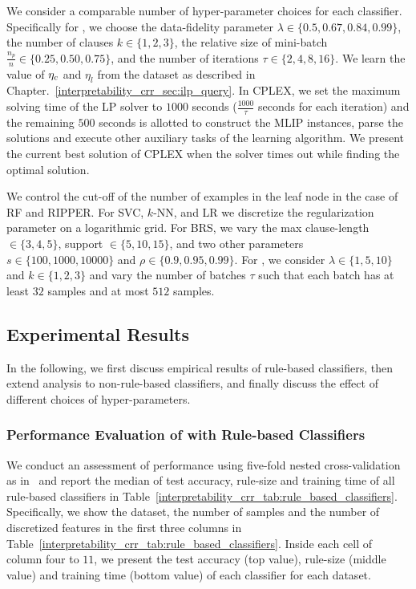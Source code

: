 


We consider a comparable number  of hyper-parameter choices  for each classifier. Specifically for {\crr}, we choose the data-fidelity parameter $ \lambda \in \{0.5, 0.67, 0.84, 0.99\} $, the number of clauses $ k \in \{1,2,3\} $, the relative size of mini-batch $ \frac{n_p}{n} \in \{0.25, 0.50, 0.75\} $, and the number of iterations $ \tau \in \{2,4,8,16\} $. We learn the value of $ \eta_c $ and $ \eta_{l} $ from the dataset as described in Chapter.~\ref{interpretability_crr_sec:ilp_query}.  In CPLEX, we set the  maximum solving time of the LP solver to $ 1000 $  seconds ($ \frac{ 1000 }{\tau} $ seconds for each iteration) and the remaining $ 500 $ seconds is allotted to construct the MLIP instances, parse the solutions and execute  other auxiliary tasks of the learning algorithm. We present the current best solution of CPLEX when the solver times out while finding the optimal solution.  

We control the cut-off of the number of examples in the leaf node in the case of RF and RIPPER. For SVC, $ k $-NN, and LR we discretize the regularization parameter on a logarithmic grid. For BRS, we vary the max clause-length $ \in \{3,4,5\} $, support $ \in  \{5,10,15\} $, and two other parameters $ s \in \{100,1000,10000\} $ and $ \rho \in \{0.9,0.95,0.99\} $.  For  {\IMLI}, we consider  $ \lambda \in \{1,5,10\} $ and  $ k \in \{1,2,3\} $ and  vary the number of batches $ \tau $ such that each batch has at least $ 32 $ samples and at most $ 512 $ samples.  




	








\subsection{Experimental Results}
In the following, we first discuss empirical results of rule-based classifiers, then extend analysis to non-rule-based classifiers, and finally discuss the effect of different choices of hyper-parameters. 
\subsubsection{Performance Evaluation of {\crr} with Rule-based Classifiers}
We conduct an assessment of performance  using five-fold nested cross-validation as in~\cite{DGW2018}  and report the median of test accuracy, rule-size and training time of all rule-based classifiers in Table~\ref{interpretability_crr_tab:rule_based_classifiers}. 
Specifically, we show the dataset,  the number of samples and the number of discretized features in the first three columns in Table~\ref{interpretability_crr_tab:rule_based_classifiers}. Inside each cell of column   four to $    11 $,  we present the   test accuracy (top value), rule-size (middle value) and training time (bottom value) of each classifier for each dataset. 



